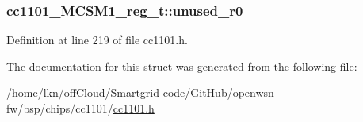 \subsubsection[{\texorpdfstring{unused\+\_\+r0}{unused_r0}}]{ cc1101\+\_\+\+M\+C\+S\+M1\+\_\+reg\+\_\+t\+::unused\+\_\+r0}\hypertarget{structcc1101___m_c_s_m1__reg__t_a6b6a5679210d88dc6414da00ed7b3053}{}\label{structcc1101___m_c_s_m1__reg__t_a6b6a5679210d88dc6414da00ed7b3053}


Definition at line 219 of file cc1101.\+h.



The documentation for this struct was generated from the following file\+:\begin{DoxyCompactItemize}
\item 
/home/lkn/off\+Cloud/\+Smartgrid-\/code/\+Git\+Hub/openwsn-\/fw/bsp/chips/cc1101/\hyperlink{cc1101_8h}{cc1101.\+h}\end{DoxyCompactItemize}
